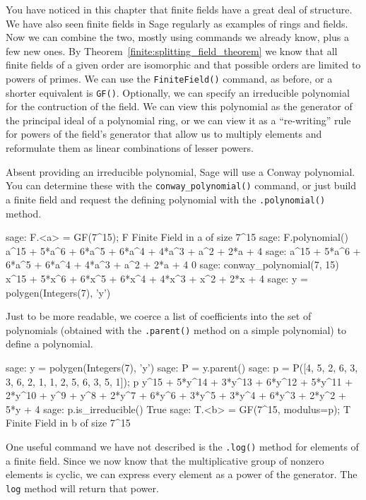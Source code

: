 You have noticed in this chapter that finite fields have a great deal of structure.  We have also seen finite fields in Sage regularly as examples of rings and fields.  Now we can combine the two, mostly using commands we already know, plus a few new ones.
%
%
By Theorem~\ref{finite:splitting_field_theorem} we know that all finite fields of a given order are isomorphic and that possible orders are limited to powers of primes.  We can use the \verb?FiniteField()? command, as before, or a shorter equivalent is \verb?GF()?.  Optionally, we can specify an irreducible polynomial for the contruction of the field.  We can view this polynomial as the generator of the principal ideal of a polynomial ring, or we can view it as a ``re-writing'' rule for powers of the field's generator that allow us to multiply elements and reformulate them as linear combinations of lesser powers.\par
%
Absent providing an irreducible polynomial, Sage will use a Conway polynomial.  You can determine these with the \verb?conway_polynomial()? command, or just build a finite field and request the defining polynomial with the \verb?.polynomial()? method.
%
\begin{sageexample}
sage: F.<a> = GF(7^15); F
Finite Field in a of size 7^15
sage: F.polynomial()
a^15 + 5*a^6 + 6*a^5 + 6*a^4 + 4*a^3 + a^2 + 2*a + 4
sage: a^15 + 5*a^6 + 6*a^5 + 6*a^4 + 4*a^3 + a^2 + 2*a + 4
0
sage: conway_polynomial(7, 15)
x^15 + 5*x^6 + 6*x^5 + 6*x^4 + 4*x^3 + x^2 + 2*x + 4
sage: y = polygen(Integers(7), 'y')
\end{sageexample}
%
Just to be more readable, we coerce a list of coefficients into the set of polynomials (obtained with the \verb?.parent()? method on a simple polynomial) to define a polynomial.
%
\begin{sageexample}
sage: y = polygen(Integers(7), 'y')
sage: P = y.parent()
sage: p = P([4, 5, 2, 6, 3, 3, 6, 2, 1, 1, 2, 5, 6, 3, 5, 1]); p
y^15 + 5*y^14 + 3*y^13 + 6*y^12 + 5*y^11 + 2*y^10 + y^9 +
y^8 + 2*y^7 + 6*y^6 + 3*y^5 + 3*y^4 + 6*y^3 + 2*y^2 + 5*y + 4
sage: p.is_irreducible()
True
sage: T.<b> = GF(7^15, modulus=p); T
Finite Field in b of size 7^15
\end{sageexample}
%
One useful command we have not described is the \verb?.log()? method for elements of a finite field.  Since we now know that the multiplicative group of nonzero elements is cyclic, we can express every element as a power of the generator.  The \verb?log? method will return that power.\par
